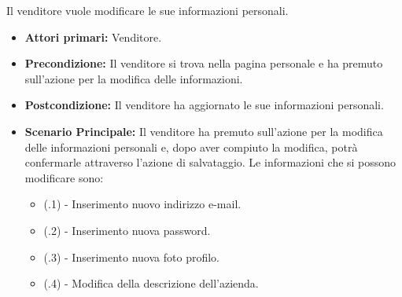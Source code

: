 Il venditore vuole modificare le sue informazioni personali.
\begin{itemize}
    \item \textbf{Attori primari:} Venditore.
    \item \textbf{Precondizione:} Il venditore si trova nella pagina personale e ha premuto sull'azione per la modifica delle informazioni.
    \item \textbf{Postcondizione:} Il venditore ha aggiornato le sue informazioni personali.
    \item \textbf{Scenario Principale:} Il venditore ha premuto sull'azione per la modifica delle informazioni personali e, dopo aver compiuto la modifica, potrà confermarle attraverso l'azione di salvataggio. Le informazioni che si possono modificare sono:
    \begin{itemize}
        \item (\actualUC.1) - Inserimento nuovo indirizzo e-mail.
        \item (\actualUC.2) - Inserimento nuova password.
        \item (\actualUC.3) - Inserimento nuova foto profilo.
        \item (\actualUC.4) - Modifica della descrizione dell'azienda.
    \end{itemize}
\end{itemize}

\resetSubUC

